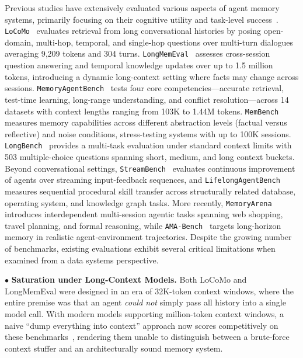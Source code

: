 \documentclass{llmxive}
\begin{document}
Previous studies have extensively evaluated various aspects of agent memory systems, primarily focusing on their cognitive utility and task-level success~\cite{maharana2024locomo, wu2024longmemeval, memoryagentbench2026, tan2025membench}.  \texttt{LoCoMo}~\cite{maharana2024locomo} evaluates retrieval from long conversational histories by posing open-domain, multi-hop, temporal, and single-hop questions over multi-turn dialogues averaging 9,209 tokens and 304 turns. \texttt{LongMemEval}~\cite{wu2024longmemeval} assesses cross-session question answering and temporal knowledge updates over up to 1.5 million tokens, introducing a dynamic long-context setting where facts may change across sessions. \texttt{MemoryAgentBench}~\cite{memoryagentbench2026} tests four core competencies---accurate retrieval, test-time learning, long-range understanding, and conflict resolution---across 14 datasets with context lengths ranging from 103K to 1.44M tokens. \texttt{MemBench}~\cite{tan2025membench} measures memory capabilities across different abstraction levels (factual versus reflective) and noise conditions, stress-testing systems with up to 100K sessions. \texttt{LongBench}~\cite{bai2023longbench} provides a multi-task evaluation under standard context limits with 503 multiple-choice questions spanning short, medium, and long context buckets. Beyond conversational settings, \texttt{StreamBench}~\cite{wu2024streambench} evaluates continuous improvement of agents over streaming input-feedback sequences, and \texttt{LifelongAgentBench}~\cite{lifelongagentbench2025} measures sequential procedural skill transfer across structurally related database, operating system, and knowledge graph tasks. More recently, \texttt{MemoryArena}~\cite{memoryarena2026} introduces interdependent multi-session agentic tasks spanning web shopping, travel planning, and formal reasoning, while \texttt{AMA-Bench}~\cite{amabench2026} targets long-horizon memory in realistic agent-environment trajectories. Despite the growing number of benchmarks, existing evaluations exhibit several critical limitations when examined from a data systems perspective.

\noindent $\bullet$ \textbf{Saturation under Long-Context Models.} Both LoCoMo and LongMemEval were designed in an era of 32K-token context windows, where the entire premise was that an agent \textit{could not} simply pass all history into a single model call. With modern models supporting million-token context windows, a naive ``dump everything into context'' approach now scores competitively on these benchmarks~\cite{chhikara2025mem0}, rendering them unable to distinguish between a brute-force context stuffer and an architecturally sound memory system.
\end{document}
